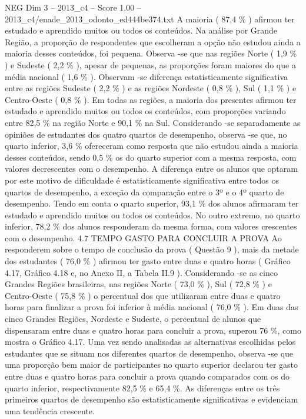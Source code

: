 \begin{textsample}{NEG Dim 3 – 2013\_c4 – Score 1.00 – 2013\_c4/enade\_2013\_odonto\_ed444be374.txt}
A maioria ( 87,4 \% ) afirmou ter estudado e aprendido muitos ou todos os conteúdos.
Na análise por Grande Região, a proporção de respondentes que escolheram a opção não estudou ainda a maioria desses conteúdos, foi pequena.
Observa -se que nas regiões Norte ( 1,9 \% ) e Sudeste ( 2,2 \% ), apesar de pequenas, as proporções foram maiores do que a média nacional ( 1,6 \% ).
Observam -se diferença estatisticamente significativa entre as regiões Sudeste ( 2,2 \% ) e as regiões Nordeste ( 0,8 \% ), Sul ( 1,1 \% ) e Centro-Oeste ( 0,8 \% ).
Em todas as regiões, a maioria dos presentes afirmou ter estudado e aprendido muitos ou todos os conteúdos, com proporções variando entre 82,5 \% na região Norte e 90,1 \% na Sul.
Considerando -se separadamente as opiniões de estudantes dos quatro quartos de desempenho, observa -se que, no quarto inferior, 3,6 \% ofereceram como resposta que não estudou ainda a maioria desses conteúdos, sendo 0,5 \% os do quarto superior com a mesma resposta, com valores decrescentes com o desempenho.
A diferença entre os alunos que optaram por este motivo de dificuldade é estatisticamente significativa entre todos os quartos de desempenho, a exceção da comparação entre o 3º e o 4º quarto de desempenho.
Tendo em conta o quarto superior, 93,1 \% dos alunos afirmaram ter estudado e aprendido muitos ou todos os conteúdos.
No outro extremo, no quarto inferior, 78,2 \% dos alunos responderam da mesma forma, com valores crescentes com o desempenho. 4.7 TEMPO GASTO PARA CONCLUIR A PROVA Ao responderem sobre o tempo de conclusão da prova ( Questão 9 ), mais da metade dos estudantes ( 76,0 \% ) afirmou ter gasto entre duas e quatro horas ( Gráfico 4.17, Gráfico 4.18 e, no Anexo II, a Tabela II.9 ).
Considerando -se as cinco Grandes Regiões brasileiras, nas regiões Norte ( 73,0 \% ), Sul ( 72,8 \% ) e Centro-Oeste ( 75,8 \% ) o percentual dos que utilizaram entre duas e quatro horas para finalizar a prova foi inferior à média nacional ( 76,0 \% ).
Em duas das cinco Grandes Regiões, Nordeste e Sudeste, o percentual de alunos que dispensaram entre duas e quatro horas para concluir a prova, superou 76 \%, como mostra o Gráfico 4.17.
Uma vez sendo analisadas as alternativas escolhidas pelos estudantes que se situam nos diferentes quartos de desempenho, observa -se que uma proporção bem maior de participantes no quarto superior declarou ter gasto entre duas e quatro horas para concluir a prova quando comparados com os do quarto inferior, respectivamente 82,5 \% e 65,4 \%.
As diferenças entre os três primeiros quartos de desempenho são estatisticamente significativas e evidenciam uma tendência crescente.

\end{textsample}
